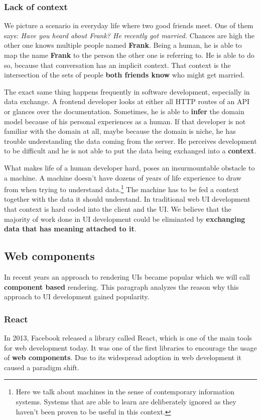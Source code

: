 \subsubsection{Lack of context}\label{datahumanmachine}
We picture a scenario in everyday life where two good friends meet. One of them says: \textit{Have you heard about Frank? He recently got married.} Chances are high the other one knows multiple people named \textbf{Frank}. Being a human, he is able to map the name \textbf{Frank} to the person the other one is referring to. He is able to do so, because that conversation has an implicit context. That context is the intersection of the sets of people \textbf{both friends know} who might get married.
\par The exact same thing happens frequently in software development, especially in data exchange. A frontend developer looks at either all HTTP routes of an API or glances over the documentation. Sometimes, he is able to \textbf{infer} the domain model because of his personal experiences as a human. If that developer is not familiar with the domain at all, maybe because the domain is niche, he has trouble understanding the data coming from the server. He perceives development to be difficult and he is not able to put the data being exchanged into a \textbf{context}.
\par What makes life of a human developer hard, poses an insurmountable obstacle to a machine. A machine doesn't have dozens of years of life experience to draw from when trying to understand data.\footnote{Here we talk about machines in the sense of contemporary information systems. Systems that are able to learn are deliberately ignored as they haven't been proven to be useful in this context.} The machine has to be fed a context together with the data it should understand. In traditional web UI development that context is hard coded into the client and the UI. We believe that the majority of work done in UI development could be eliminated by \textbf{exchanging data that has meaning attached to it}.

\subsection{Web components}\label{webcomponents}
In recent years an approach to rendering UIs became popular which we will call \textbf{component based} rendering. This paragraph analyzes the reason why this approach to UI development gained popularity.

\subsubsection{React}\label{sec:react}
In 2013, Facebook released a library called React, which is one of the main tools for web development today. It was one of the first libraries to encourage the usage of \textbf{web components}. Due to its widespread adoption in web development it caused a paradigm shift.

